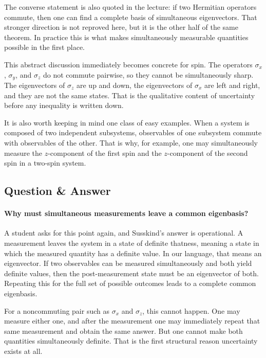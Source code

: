 The converse statement is also quoted in the lecture: if two Hermitian operators commute, then one can find a complete basis of simultaneous eigenvectors. That stronger direction is not reproved here, but it is the other half of the same theorem. In practice this is what makes simultaneously measurable quantities possible in the first place.

This abstract discussion immediately becomes concrete for spin. The operators \(\sigma_x\), \(\sigma_y\), and \(\sigma_z\) do not commute pairwise, so they cannot be simultaneously sharp. The eigenvectors of \(\sigma_z\) are up and down, the eigenvectors of \(\sigma_x\) are left and right, and they are not the same states. That is the qualitative content of uncertainty before any inequality is written down.

It is also worth keeping in mind one class of easy examples. When a system is composed of two independent subsystems, observables of one subsystem commute with observables of the other. That is why, for example, one may simultaneously measure the \(z\)-component of the first spin and the \(z\)-component of the second spin in a two-spin system.

\subsection{Question \& Answer}

\paragraph{Why must simultaneous measurements leave a common eigenbasis?}
A student asks for this point again, and Susskind's answer is operational. A measurement leaves the system in a state of definite thatness, meaning a state in which the measured quantity has a definite value. In our language, that means an eigenvector. If two observables can be measured simultaneously and both yield definite values, then the post-measurement state must be an eigenvector of both. Repeating this for the full set of possible outcomes leads to a complete common eigenbasis.

For a noncommuting pair such as \(\sigma_x\) and \(\sigma_z\), this cannot happen. One may measure either one, and after the measurement one may immediately repeat that same measurement and obtain the same answer. But one cannot make both quantities simultaneously definite. That is the first structural reason uncertainty exists at all.

